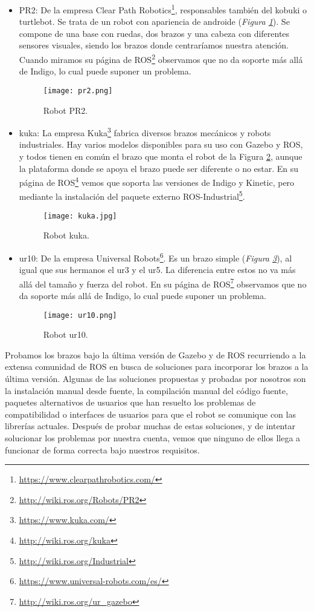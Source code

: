 \begin{itemize}
	\item PR2: De la empresa Clear Path Robotics\footnote{\url{https://www.clearpathrobotics.com/}}, responsables también del kobuki o turtlebot. Se trata de un robot con apariencia de androide (\textit{Figura \ref{fig:pr2}}). Se compone de una base con ruedas, dos brazos y una cabeza con diferentes sensores visuales, siendo los brazos donde centraríamos nuestra atención. Cuando miramos su página de ROS\footnote{\url{http://wiki.ros.org/Robots/PR2}} observamos que no da soporte más allá de Indigo, lo cual puede suponer un problema.
	\begin{figure}[h]
		\centering\texttt{[image: pr2.png]}
		\caption{Robot PR2.}
		\label{fig:pr2}
	\end{figure}
	\item kuka: La empresa Kuka\footnote{\url{https://www.kuka.com/}} fabrica diversos brazos mecánicos y robots industriales. Hay varios modelos disponibles para su uso con Gazebo y ROS, y todos tienen en común el brazo que monta el robot de la Figura \ref{fig:kuka}, aunque la plataforma donde se apoya el brazo puede ser diferente o no estar. En su página de ROS\footnote{\url{http://wiki.ros.org/kuka}} vemos que soporta las versiones de Indigo y Kinetic, pero mediante la instalación del paquete externo ROS-Industrial\footnote{\url{http://wiki.ros.org/Industrial}}.
	\begin{figure}[h]
		\centering\texttt{[image: kuka.jpg]}
		\caption{Robot kuka.}
		\label{fig:kuka}
	\end{figure}
	\item ur10: De la empresa Universal Robots\footnote{\url{https://www.universal-robots.com/es/}}. Es un brazo simple (\textit{Figura \ref{fig:ur10}}), al igual que sus hermanos el ur3 y el ur5. La diferencia entre estos no va más allá del tamaño y fuerza del robot. En su página de ROS\footnote{\url{http://wiki.ros.org/ur_gazebo}} observamos que no da soporte más allá de Indigo, lo cual puede suponer un problema.
	\begin{figure}[h]
		\centering\texttt{[image: ur10.png]}
		\caption{Robot ur10.}
		\label{fig:ur10}
	\end{figure}
\end{itemize}

Probamos los brazos bajo la última versión de Gazebo y de ROS recurriendo a la extensa comunidad de ROS en busca de soluciones para incorporar los brazos a la última versión. Algunas de las soluciones propuestas y probadas por nosotros son la instalación manual desde fuente, la compilación manual del código fuente, paquetes alternativos de usuarios que han resuelto los problemas de compatibilidad o interfaces de usuarios para que el robot se comunique con las librerías actuales. Después de probar muchas de estas soluciones, y de intentar solucionar los problemas por nuestra cuenta, vemos que ninguno de ellos llega a funcionar de forma correcta bajo nuestros requisitos.

